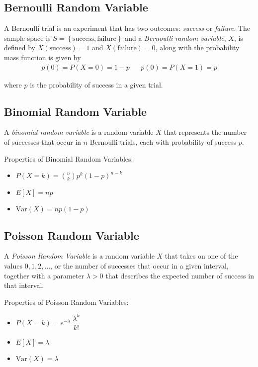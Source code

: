 \documentclass[10pt]{article}
\theoremstyle{definition}
\theoremstyle{theorem}
\begin{document}
		\subsection*{Bernoulli  Random Variable}
		
		A Bernoulli trial is an experiment that has two outcomes: \emph{success} or \emph{failure}. The sample space is $S=\left\{ \text{success}, \text{failure}\right\}$ and a \emph{Bernoulli random variable}, $X$, is defined by $X(\text{success})=1$ and $X(\text{failure}) = 0$, along with the probability mass function is given by
		\begin{align*}
			p(0) = P(X=0) = 1 - p  && p(0) = P(X=1) = p
		\end{align*}
		
		where $p$ is the probability of success in a given trial.
		\subsection*{Binomial Random Variable}
		A \emph{binomial random variable} is a random variable $X$ that represents the number of successes that occur in $n$ Bernoulli trials, each with probability of success $p$.
		
		Properties of Binomial Random Variables:
		\begin{multicols}{3}
			\begin{itemize}
				\item $P(X=k) = {n \choose k} p^{k} (1-p)^{n-k}$
				\item $E[X] = np$
				\item $\text{Var}(X)= np(1-p) $
			\end{itemize}
		\end{multicols}
		
		
		\subsection*{Poisson Random Variable}
		
		A \emph{Poisson Random Variable} is a random variable $X$ that takes on one of the values $0, 1, 2, \ldots$, or the number of successes that occur in a given interval, together with a parameter $\lambda > 0$ that describes the expected number of success in that interval.
		
		Properties of Poisson Random Variables:
		
		\begin{multicols}{3}
			\begin{itemize}
				\item $P(X=k) = e^{-\lambda} \: \dfrac{\lambda^k}{k!}$
				\item $E[X] = \lambda$
				\item $\text{Var}(X) = \lambda$
			\end{itemize}
		\end{multicols}
	
\end{document}
